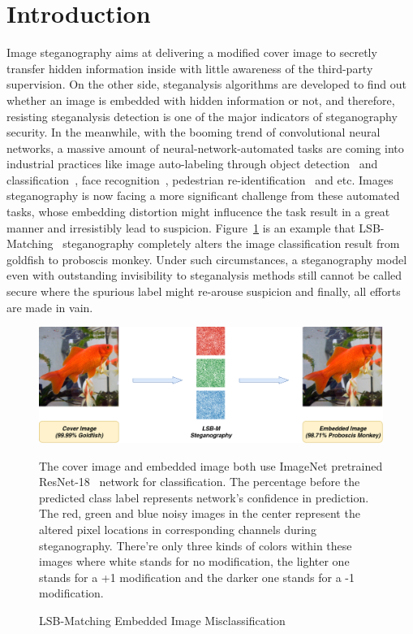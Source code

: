 \section{Introduction}

Image steganography aims at delivering a modified cover image to secretly transfer hidden information inside with little awareness of the third-party supervision. On the other side, steganalysis algorithms are developed to find out whether an image is embedded with hidden information or not, and therefore, resisting steganalysis detection is one of the major indicators of steganography security. In the meanwhile, with the booming trend of convolutional neural networks, a massive amount of neural-network-automated tasks are coming into industrial practices like image auto-labeling through object detection~\cite{Fast_R_CNN,YOLO} and classification~\cite{ResNet,InceptionV4}, face recognition~\cite{FaceNet}, pedestrian re-identification~\cite{CamStylePedestrian} and etc. Images steganography is now facing a more significant challenge from these automated tasks, whose embedding distortion might influcence the task result in a great manner and irresistibly lead to suspicion. Figure~\ref{fig:steganography_distortion} is an example that LSB-Matching~\cite{LSBRevisited} steganography completely alters the image classification result from goldfish to proboscis monkey. Under such circumstances, a steganography model even with outstanding invisibility to steganalysis methods still cannot be called secure where the spurious label might re-arouse suspicion and finally, all efforts are made in vain.

\begin{figure}
  \centering
  \includegraphics[width=0.9\columnwidth]{images/Steganography-Distortion/Steganography-Distortion.png}%
  \caption{LSB-Matching Embedded Image Misclassification}%
  \label{fig:steganography_distortion}
  \vspace{\baselineskip}
  The cover image and embedded image both use ImageNet pretrained ResNet-18~\cite{ResNet} network for classification. The percentage before the predicted class label represents network's confidence in prediction. The red, green and blue noisy images in the center represent the altered pixel locations in corresponding channels during steganography. There're only three kinds of colors within these images where white stands for no modification, the lighter one stands for a +1 modification and the darker one stands for a -1 modification.
\end{figure}

